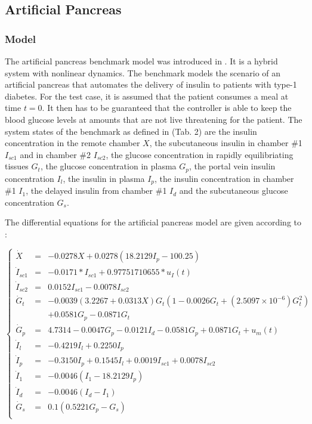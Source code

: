 \documentclass[EPiC]{easychair}
\begin{document}

\iffalse
\subsection{Artificial Pancreas}
\label{sec:artificialpancreas}

\subsubsection{Model}

The artificial pancreas benchmark model was introduced in \cite{Chen2017}. It is a hybrid system with nonlinear dynamics. The benchmark models the scenario of an artificial pancreas that automates the delivery of insulin to patients with type-1 diabetes. For the test case, it is assumed that the patient consumes a meal at time $t=0$. It then has to be guaranteed that the controller is able to keep the blood glucose levels at amounts that are not live threatening for the patient. The system states of the benchmark as defined in \cite{Chen2017} (Tab. 2) are the insulin concentration in the remote chamber $X$, the subcutaneous insulin in chamber \#1 $I_{sc1}$ and in chamber \#2 $I_{sc2}$, the glucose concentration in rapidly equilibriating tissues $G_t$, the glucose concentration in plasma $G_p$, the portal vein insulin concentration $I_l$, the insulin in plasma $I_p$, the insulin concentration in chamber \#1 $I_1$, the delayed insulin from chamber \#1 $I_d$ and the subcutaneous glucose concentration $G_s$. 


The differential equations for the artificial pancreas model are given according to \cite{Chen2017}:

\[
\left\{
\begin{array}{lcl}
\dot{X} & = & -0.0278X + 0.0278(18.2129 I_p - 100.25)\\
\dot{I}_{sc1} & = &  -0.0171 * I_{sc1} + 0.97751710655*u_I(t) \\
\dot{I}_{sc2} & = & 0.0152 I_{sc1} - 0.0078 I_{sc2} \\
\dot{G}_t & = & -0.0039 (3.2267+0.0313X) G_t ( 1 - 0.0026 G_t + (2.5097 \times 10^{-6}) G_t^2) \\
& & + 0.0581 G_p - 0.0871 G_t \\
\dot{G}_p & = & 4.7314 - 0.0047 G_p - 0.0121 I_d - 0.0581 G_p + 0.0871 G_t + u_m(t) \\
\dot{I}_l & = & -0.4219 I_l + 0.2250 I_p \\
\dot{I}_p & = & -0.3150 I_p + 0.1545 I_l + 0.0019 I_{sc1} + 0.0078 I_{sc2} \\
\dot{I}_1 & = & -0.0046 ( I_1 - 18.2129 I_p) \\
\dot{I}_d & = & -0.0046 (I_d - I_1 ) \\
\dot{G}_s & = & 0.1 ( 0.5221 G_p - G_s) \\
\end{array}
\right.
\]
\end{document}
